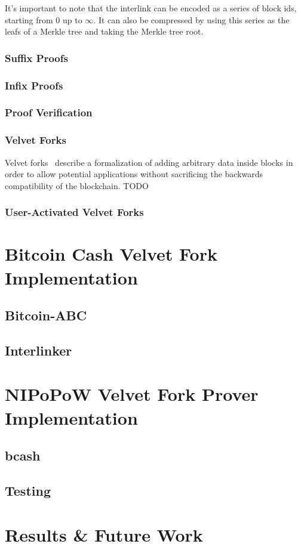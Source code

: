 \documentclass[11pt]{llncs}
\begin{document}
It's important to note that the interlink can be encoded as a series of block ids, starting from $0$ up to $\infty$. It can also be compressed by using this series as the leafs of a Merkle tree and taking the Merkle tree root.

\subsubsection{Suffix Proofs}
\subsubsection{Infix Proofs}
\subsubsection{Proof Verification}
\subsubsection{Velvet Forks}
Velvet forks~\cite{nipopows,velvet} describe a formalization of adding
arbitrary data inside blocks in order to allow potential applications without
sacrificing the backwards compatibility of the blockchain. TODO

\subsubsection{User-Activated Velvet Forks}

\section{Bitcoin Cash Velvet Fork Implementation}

\subsection{Bitcoin-ABC}
\subsection{Interlinker}

\section{NIPoPoW Velvet Fork Prover Implementation}

\subsection{bcash}
\subsection{Testing}

\section{Results \& Future Work}


\end{document}
